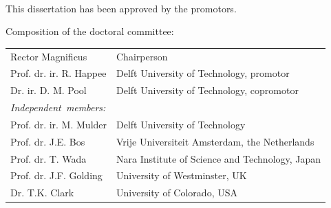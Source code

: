 \begin{titlepage}
\begin{center}
\bigskip
\bigskip
\bigskip
\bigskip
\bigskip

\makeatletter
{\Large\titlefont\bfseries\@firstname\ \titleshape{\MakeUppercase{\@lastname}}}
\makeatother

\bigskip


\vspace*{4\bigskipamount}

\end{center}

\clearpage
\thispagestyle{empty}

\noindent This dissertation has been approved by the promotors.


\bigskip
\noindent Composition of the doctoral committee:

\medskip\noindent
\begin{tabular}{p{4.5cm}l}
    Rector Magnificus & Chairperson \\
    Prof. dr. ir. R. Happee & Delft University of Technology, promotor \\
    Dr. ir. D. M. Pool & Delft University of Technology, copromotor \\

    \medskip
    \mbox{\emph{Independent members:}} & \\
    Prof. dr. ir. M. Mulder & Delft University of Technology \\
    Prof. dr. J.E. Bos & Vrije Universiteit Amsterdam, the Netherlands \\
    Prof. dr. T. Wada & Nara Institute of Science and Technology, Japan \\
    Prof. dr. J.F. Golding & University of Westminster, UK \\
    Dr. T.K. Clark & University of Colorado, USA \\
    

\end{tabular}
\end{titlepage}
